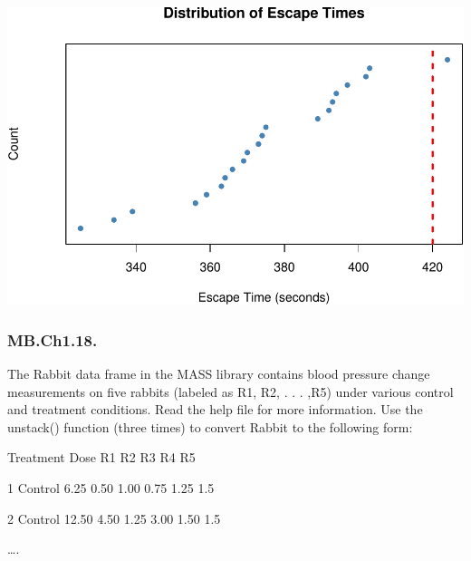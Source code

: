 \documentclass[
]{article}
\begin{document}
\includegraphics{Homework-02_files/figure-latex/unnamed-chunk-23-1.pdf}

\subsubsection{MB.Ch1.18.}\label{mb.ch1.18.}

The Rabbit data frame in the MASS library contains blood pressure change
measurements on five rabbits (labeled as R1, R2, . . . ,R5) under
various control and treatment conditions. Read the help file for more
information. Use the unstack() function (three times) to convert Rabbit
to the following form:

Treatment Dose R1 R2 R3 R4 R5

1 Control 6.25 0.50 1.00 0.75 1.25 1.5

2 Control 12.50 4.50 1.25 3.00 1.50 1.5

\ldots.
\end{document}
